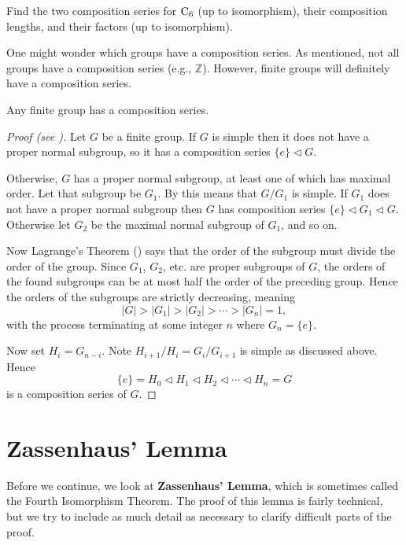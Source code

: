 \begin{exercise}
    Find the two composition series for $\mathrm{C}_{6}$ (up to isomorphism), their composition lengths, and their factors (up to isomorphism).
\end{exercise}

One might wonder which groups have a composition series. As mentioned, not all groups have a composition series (e.g., $\mathbb{Z}$). However, finite groups will definitely have a composition series.
\begin{theorem}\label{thrm-finite-group-has-composition-series}
    Any finite group has a composition series.
\end{theorem}
\begin{proof}[Proof (see \cite{hungerford_1980, proofwiki_finitegrouphascompositionseries})]
    Let $G$ be a finite group. If $G$ is simple then it does not have a proper normal subgroup, so it has a composition series $\{e\} \lhd G$.
    
    Otherwise, $G$ has a proper normal subgroup, at least one of which has maximal order. Let that subgroup be $G_1$. By  this means that $G/G_1$ is simple. If $G_1$ does not have a proper normal subgroup then $G$ has composition series $\{e\} \lhd G_1 \lhd G$. Otherwise let $G_2$ be the maximal normal subgroup of $G_1$, and so on. 
    
    Now Lagrange's Theorem () says that the order of the subgroup must divide the order of the group. Since $G_1$, $G_2$, etc. are proper subgroups of $G$, the orders of the found subgroups can be at most half the order of the preceding group. Hence the orders of the subgroups are strictly decreasing, meaning
    \[
        |G| > |G_1| > |G_2| > \cdots > |G_n| = 1,
    \]
    with the process terminating at some integer $n$ where $G_n = \{e\}$.
    
    \newpage

    Now set $H_i = G_{n-i}$. Note $H_{i+1}/H_i = G_i/G_{i+1}$ is simple as discussed above. Hence
    \[
        \{e\} = H_0 \lhd H_1 \lhd H_2 \lhd \cdots \lhd H_n = G    
    \]
    is a composition series of $G$.
\end{proof}

\section{Zassenhaus' Lemma}
Before we continue, we look at \textbf{Zassenhaus' Lemma}, which is sometimes called the Fourth Isomorphism Theorem. The proof of this lemma is fairly technical, but we try to include as much detail as necessary to clarify difficult parts of the proof.

